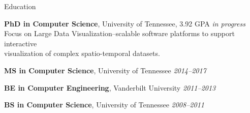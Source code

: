 \documentclass{resume} %
\begin{document}

\begin{rSection}{Education}

{{\bf PhD in Computer Science}, University of Tennessee, 3.92 GPA} \hfill {\em in progress} \\ 
Focus on Large Data Visualization--scalable software platforms to support interactive \\
visualization of complex spatio-temporal datasets.

{{\bf MS in Computer Science}, University of Tennessee} \hfill {\em 2014--2017}

{{\bf BE in Computer Engineering}, Vanderbilt University} \hfill {\em 2011--2013}

{{\bf BS in Computer Science}, University of Tennessee} \hfill {\em 2008--2011}

\end{rSection}

\end{document}
